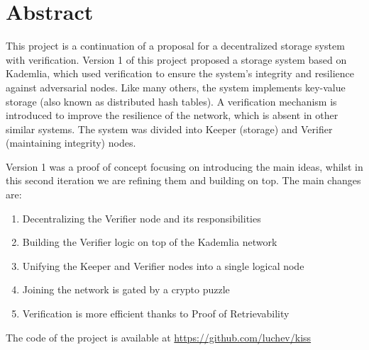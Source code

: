 \chapter{Abstract}
\label{chap:abstract}

This project is a continuation of a proposal for a decentralized storage system with verification.
Version 1 of this project proposed a storage system based on Kademlia, which used verification to ensure the system's integrity and resilience against adversarial nodes.
Like many others, the system implements key-value storage (also known as distributed hash tables).
A verification mechanism is introduced to improve the resilience of the network, which is absent in other similar systems.
The system was divided into Keeper (storage) and Verifier (maintaining integrity) nodes.

Version 1 was a proof of concept focusing on introducing the main ideas, whilst in this second iteration we are refining them and building on top.
The main changes are:

\begin{enumerate}
    \item Decentralizing the Verifier node and its responsibilities
    \item Building the Verifier logic on top of the Kademlia network
    \item Unifying the Keeper and Verifier nodes into a single logical node
    \item Joining the network is gated by a crypto puzzle
    \item Verification is more efficient thanks to Proof of Retrievability
\end{enumerate}

The code of the project is available at \href{https://github.com/luchev/kiss}{https://github.com/luchev/kiss}

